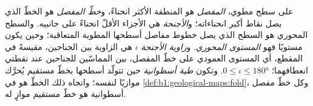 \begin{definition}\label{def:b1:faults-folds-fabrics:fold-elements}
على سطح مطوي، \emph{المفصل} هو المنطقة الأكثر انحناءً، و\emph{خطّ المفصل} هو الخطّ الذي يصل نقاط أكبر انحناءاته؛ و\emph{الأجنحة} هي الأجزاء الأقلّ انحناءً على جانبيه. والسطح المحوري  هو السطح الذي يصل خطوط مفاصل أسطحها المطوية المتعاقبة؛ وحين يكون مستويًا فهو \emph{المستوى المحوري}. و\emph{زاوية الأجنحة} $\iota$ هي الزاوية بين الجناحين، مقيسةً في المقطع، أي المستوى العمودي على خطّ المفصل، بين المماسّين للجناحين عند نقطتي انعطافهما؛ $0 \le \iota \le \ang{180}$. وتكون  \emph{طية أسطوانية} حين تتولّد أسطحها بخطّ مستقيم يُحرَّك موازيًا لنفسه؛ واتجاه ذلك الخطّ هو  في \cref{def:b1:geological-maps:fold}، وكل خطّ مفصل  أسطوانية هو خطّ مستقيم موازٍ له.
\end{definition}

